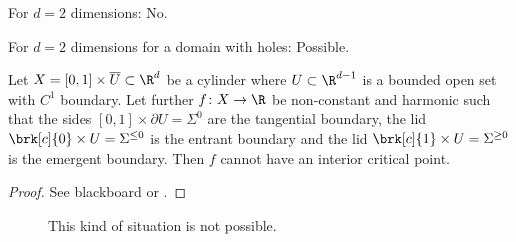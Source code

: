 
\begin{frame}

  {\questionFlowthrough
  \begin{answer}
    \begin{itemize}
      \item For $d=2$ dimensions: No. 
        {\item For $d=2$ dimensions for a domain with holes: Possible.}
    \end{itemize}
  \end{answer}}
\end{frame}

\begin{frame}
  \begin{proposition}\label{pr:n3_inflowOutflowCylinder}
    Let $X=[0,1]\times \overline{U}\subset\R^d$ be a cylinder where $U\subset\R^{d-1}$ is a bounded open set with $C^1$ boundary.
    Let further $f\colon X\to\R$ be non-constant and
    harmonic such that the sides
    $[0,1]\times \partial U=\Sigma^0$ are the tangential boundary,
    the lid $\brk[c]{0}\times U=\Sigma^{\leq0}$ is the entrant boundary and
    the lid $\brk[c]{1}\times U=\Sigma^{\geq0}$ is the emergent boundary. 
    Then $f$ cannot have an interior critical point.
  \end{proposition}
  \begin{proof}
    See blackboard or \autocite{Koppenhoefer2024}.
  \end{proof}
\end{frame}

\begin{frame}
  \begin{figure}
    \centering
    
    \caption{This kind of situation is not possible.}
    \label{fi:n3_cylinder}
  \end{figure}
\end{frame}

